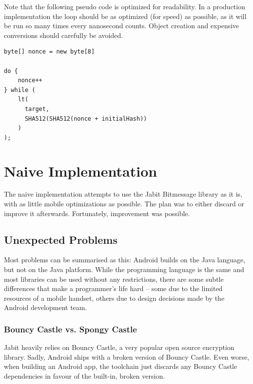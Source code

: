 \documentclass{bfh}
\begin{document}
  Note that the following pseudo code is optimized for readability. In a production implementation the loop should be as optimized (for speed) as possible, as it will be run so many times every nanosecond counts. Object creation and expensive conversions should carefully be avoided.\\

\begin{lstlisting}
byte[] nonce = new byte[8]

do {
    nonce++
} while (
    lt(
      target,
      SHA512(SHA512(nonce + initialHash))
    )
);
\end{lstlisting}



  \newpage
  \section{Naive Implementation}
  
  The naive implementation attempts to use the Jabit Bitmessage library as it is, with as little mobile optimizations as possible. The plan was to either discard or improve it afterwards. Fortunately, improvement was possible.

  \subsection{Unexpected Problems}
  Most problems can be summarised as this: Android builds on the Java language, but not on the Java platform. While the programming language is the same and most libraries can be used without any restrictions, there are some subtle differences that make a programmer's life hard -- some due to the limited resources of a mobile handset, others due to design decisions made by the Android development team.
  
  \subsubsection{Bouncy Castle vs. Spongy Castle}
  \label{subsec:bcvssc}
  Jabit heavily relies on Bouncy Castle, a very popular open source encryption library.\cite{bouncy} Sadly, Android ships with a broken version of Bouncy Castle. Even worse, when building an Android app, the toolchain just discards any Bouncy Castle dependencies in favour of the built-in, broken version.
\end{document}
